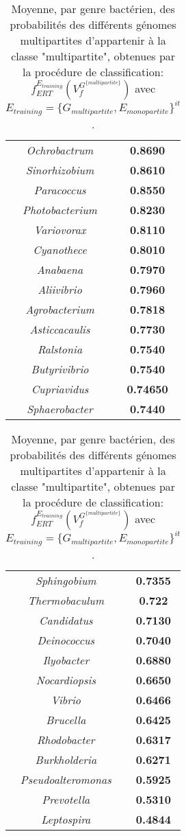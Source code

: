	  	  
\begin{table}[H]
\caption[Probabilités des génomes multipartites d'appartenir à la classe "multipartite"]{Moyenne, par genre bactérien, des probabilités des différents génomes multipartites d'appartenir à la classe "multipartite", obtenues par la procédure de classification: $f_{ERT}^{E_{training}}(V_{f}^{G^{\{multipartite\}}})$ avec $E_{training}=\{G_{multipartite},E_{monopartite}\}^{it}$ .}\label{tabGmean}
\begin{minipage}[t]{0.5\textwidth}
\small
\vspace{0cm}
\centering
\begin{tabular}{>{\itshape}c>{\bfseries}c}
Ochrobactrum&0.8690\\
Sinorhizobium&0.8610\\
Paracoccus&0.8550\\
Photobacterium&0.8230\\
Variovorax&0.8110\\
Cyanothece&0.8010\\
Anabaena&0.7970\\
Aliivibrio&0.7960\\
Agrobacterium&0.7818\\
Asticcacaulis&0.7730\\
Ralstonia&0.7540\\
Butyrivibrio&0.7540\\
Cupriavidus&0.74650\\
Sphaerobacter&0.7440\\
\end{tabular}
\end{minipage}
\begin{minipage}[t]{0.5\textwidth}
\small
\vspace{0cm}
\centering
\begin{tabular}{>{\itshape}c>{\bfseries}c}
Sphingobium&0.7355\\
Thermobaculum&0.722\\
Candidatus&0.7130\\
Deinococcus&0.7040\\
Ilyobacter&0.6880\\
Nocardiopsis&0.6650\\
Vibrio&0.6466\\
Brucella&0.6425\\
Rhodobacter&0.6317\\
Burkholderia&0.6271\\
Pseudoalteromonas&0.5925\\
Prevotella&0.5310\\
Leptospira&0.4844\\
\end{tabular}
\end{minipage}
\end{table}


